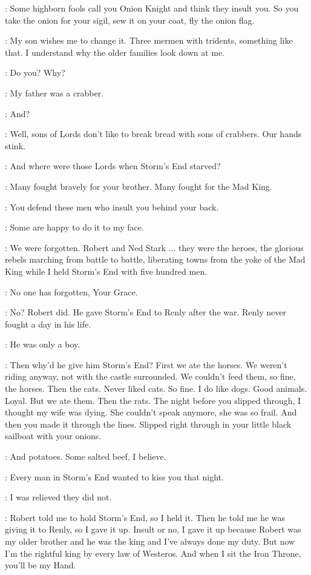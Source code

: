 \STANNIS: Some highborn fools call you Onion Knight and think they insult you. So you take the onion for your sigil, sew it on your coat, fly the onion flag. 

\DAVOS: My son wishes me to change it. Three mermen with tridents, something like that. I understand why the older families look down at me. 

\STANNIS: Do you? Why? 

\DAVOS: My father was a crabber. 

\STANNIS: And? 

\DAVOS: Well, sons of Lords don't like to break bread with sons of crabbers. Our hands stink. 

\STANNIS: And where were those Lords when Storm's End starved? 

\DAVOS: Many fought bravely for your brother. Many fought for the Mad King. 

\STANNIS: You defend these men who insult you behind your back. 

\DAVOS: Some are happy to do it to my face. 

\STANNIS: We were forgotten. Robert and Ned Stark $\ldots$ they were the heroes, the glorious rebels marching from battle to battle, liberating towns from the yoke of the Mad King while I held Storm's End with five hundred men. 

\DAVOS: No one has forgotten, Your Grace. 

\STANNIS: No? Robert did. He gave Storm's End to Renly after the war. Renly never fought a day in his life. 

\DAVOS: He was only a boy. 

\STANNIS: Then why'd he give him Storm's End? First we ate the horses. We weren't riding anyway, not with the castle surrounded. We couldn't feed them, so fine, the horses. Then the cats. Never liked cats. So fine. I do like dogs. Good animals. Loyal. But we ate them. Then the rats. The night before you slipped through, I thought my wife was dying. She couldn't speak anymore, she was so frail. And then you made it through the lines. Slipped right through in your little black sailboat with your onions. 

\DAVOS: And potatoes. Some salted beef, I believe. 

\STANNIS: Every man in Storm's End wanted to kiss you that night. 

\DAVOS: I was relieved they did not. 

\STANNIS: Robert told me to hold Storm's End, so I held it. Then he told me he was giving it to Renly, so I gave it up. Insult or no, I gave it up because Robert was my older brother and he was the king and I've always done my duty. But now I'm the rightful king by every law of Westeros. And when I sit the Iron Throne, you'll be my Hand. 

